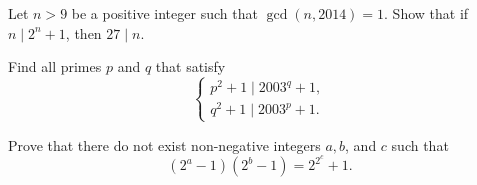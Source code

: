 \documentclass{subfile}
\begin{document}
	
	\begin{problem}
		Let $n>9$ be a positive integer such that $\gcd(n,2014)=1$. Show that if $n \mid 2^n+1$, then $27 \mid n$. %
	\end{problem}
	
	
	\begin{problem}
		Find all primes $p$ and $q$ that satisfy
		\[\left\{\begin{matrix} p^2+1\mid 2003^q+1,\\ q^2+1\mid 2003^p+1. \end{matrix}\right.\]
	\end{problem}
	
	\begin{problem}
		Prove that there do not exist non-negative integers $a,b$, and $c$ such that $$(2^a-1)(2^b-1)=2^{2^c}+1.$$ %
	\end{problem}
	
\end{document}
